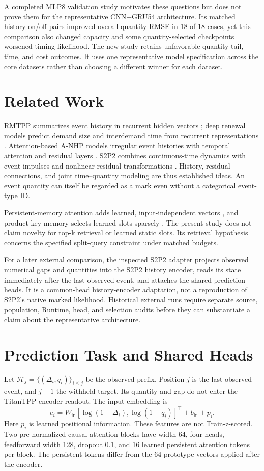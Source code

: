 \documentclass[runningheads]{llncs}
\begin{document}
A completed MLP8 validation study motivates these questions but
does not prove them for the representative CNN+GRU54 architecture.
Its matched history-on/off pairs improved overall quantity RMSE in
18 of 18 cases, yet this comparison also changed capacity and
some quantity-selected checkpoints worsened timing likelihood.
The new study retains unfavorable quantity-tail, time, and cost
outcomes. It uses one representative model specification across
the core datasets rather than choosing a different winner for
each dataset.

\section{Related Work}
RMTPP summarizes event history in recurrent hidden vectors
\cite{du2016rmtpp}; deep renewal models predict demand size
and interdemand time from recurrent representations
\cite{turkmen2021renewal}. Attention-based A-NHP models
irregular event histories with temporal attention and residual
layers \cite{yang2022anhp}. S2P2 combines continuous-time
dynamics with event impulses and nonlinear residual
transformations \cite{chang2025s2p2}. History, residual
connections, and joint time--quantity modeling are thus
established ideas. An event quantity can itself be regarded
as a mark even without a categorical event-type ID.

Persistent-memory attention adds learned, input-independent
vectors \cite{sukhbaatar2019memory}, and product-key memory
selects learned slots sparsely \cite{lample2019product}.
The present study does not claim novelty for top-k retrieval
or learned static slots. Its retrieval hypothesis concerns
the specified split-query constraint under matched budgets.

For a later external comparison, the inspected S2P2 adapter
projects observed numerical gaps and quantities into the
S2P2 history encoder, reads its state immediately after the
last observed event, and attaches the shared prediction heads.
It is a common-head history-encoder adaptation, not a
reproduction of S2P2's native marked likelihood. Historical
external runs require separate source, population, Runtime,
head, and selection audits before they can substantiate a
claim about the representative architecture.

\section{Prediction Task and Shared Heads}
Let $\mathcal H_j=\{(\Delta_i,q_i)\}_{i\le j}$ be the observed
prefix. Position $j$ is the last observed event, and $j+1$
the withheld target. Its quantity and gap do not enter the
TitanTPP encoder readout. The input embedding is
\begin{equation}
 e_i=W_{\mathrm{in}}
 [\log(1+\Delta_i),\log(1+q_i)]^\top+b_{\mathrm{in}}+p_i .
 \label{eq:embedding}
\end{equation}
Here $p_i$ is learned positional information. These features
are not Train-z-scored. Two pre-normalized causal attention
blocks have width 64, four heads, feedforward width 128,
dropout 0.1, and 16 learned persistent attention tokens
per block. The persistent tokens differ from the 64 prototype
vectors applied after the encoder.
\end{document}
